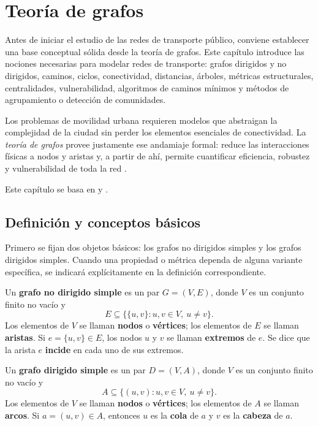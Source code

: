 \chapter{Teoría de grafos}
    Antes de iniciar el estudio de las redes de transporte público, conviene establecer una base conceptual sólida desde la teoría de grafos. Este capítulo introduce las nociones necesarias para modelar redes de transporte: grafos dirigidos y no dirigidos, caminos, ciclos, conectividad, distancias, árboles, métricas estructurales, centralidades, vulnerabilidad, algoritmos de caminos mínimos y métodos de agrupamiento o detección de comunidades.

    Los problemas de movilidad urbana requieren modelos que abstraigan la complejidad de la ciudad sin perder los elementos esenciales de conectividad. La \emph{teoría de grafos} provee justamente ese andamiaje formal: reduce las interacciones físicas a nodos y aristas y, a partir de ahí, permite cuantificar eficiencia, robustez y vulnerabilidad de toda la red \cite{rodrigues2020}.

    Este capítulo se basa en \cite{diestel2017} y \cite{bangjensen2007}.

    \section{Definición y conceptos básicos}

        Primero se fijan dos objetos básicos: los grafos no dirigidos simples y los grafos dirigidos simples. Cuando una propiedad o métrica dependa de alguna variante específica, se indicará explícitamente en la definición correspondiente.

        \begin{definicion}
            Un \textbf{grafo no dirigido simple} es un par $G=(V,E)$, donde $V$ es un conjunto finito no vacío y
            \[
                E\subseteq \{\{u,v\}:u,v\in V,\ u\neq v\}.
            \]
            Los elementos de $V$ se llaman \textbf{nodos} o \textbf{vértices}; los elementos de $E$ se llaman \textbf{aristas}. Si $e=\{u,v\}\in E$, los nodos $u$ y $v$ se llaman \textbf{extremos} de $e$. Se dice que la arista $e$ \textbf{incide} en cada uno de sus extremos.
        \end{definicion}

        \begin{definicion}
            Un \textbf{grafo dirigido simple} es un par $D=(V,A)$, donde $V$ es un conjunto finito no vacío y
            \[
                A\subseteq \{(u,v):u,v\in V,\ u\neq v\}.
            \]
            Los elementos de $V$ se llaman \textbf{nodos} o \textbf{vértices}; los elementos de $A$ se llaman \textbf{arcos}. Si $a=(u,v)\in A$, entonces $u$ es la \textbf{cola} de $a$ y $v$ es la \textbf{cabeza} de $a$.
        \end{definicion}

